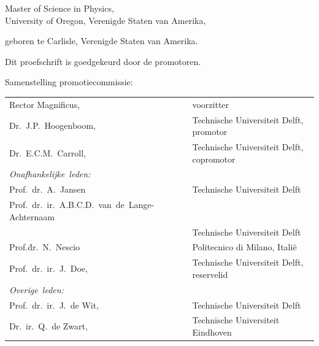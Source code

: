 \begin{titlepage}
\begin{center}
\bigskip
\bigskip

Master of Science in Physics, \\
University of Oregon, Verenigde Staten van Amerika,

geboren te Carlisle, Verenigde Staten van Amerika.

\vspace*{2\bigskipamount}

\end{center}

\clearpage
\thispagestyle{empty}

\noindent Dit proefschrift is goedgekeurd door de promotoren.


\bigskip
\noindent Samenstelling promotiecommissie:

\medskip\noindent
\begin{tabular}{p{4cm}l}
    Rector Magnificus, & voorzitter \\
    Dr.\ J.P.\ Hoogenboom, & Technische Universiteit Delft, promotor \\
    Dr.\ E.C.M.\ Carroll, & Technische Universiteit Delft, copromotor \\

    \medskip
    \mbox{\emph{Onafhankelijke leden:}} & \\

    Prof.\ dr.\ A.\ Jansen & Technische Universiteit Delft \\
    \mbox{Prof.\ dr.\ ir.\ A.B.C.D.\ van de Lange-Achternaam} & \\
      & Technische Universiteit Delft \\
    Prof.\.dr.\ N.\ Nescio & Politecnico di Milano, Itali\"e \\
    Prof.\ dr.\ ir.\ J.\ Doe, & Technische Universiteit Delft, reservelid \\

    \medskip
    \mbox{\emph{Overige leden:}} & \\
    Prof.\ dr.\ ir.\ J.\ de Wit, & Technische Universiteit Delft \\
    Dr.\ ir.\ Q.\ de Zwart, & Technische Universiteit Eindhoven \\
\end{tabular}


\end{titlepage}
